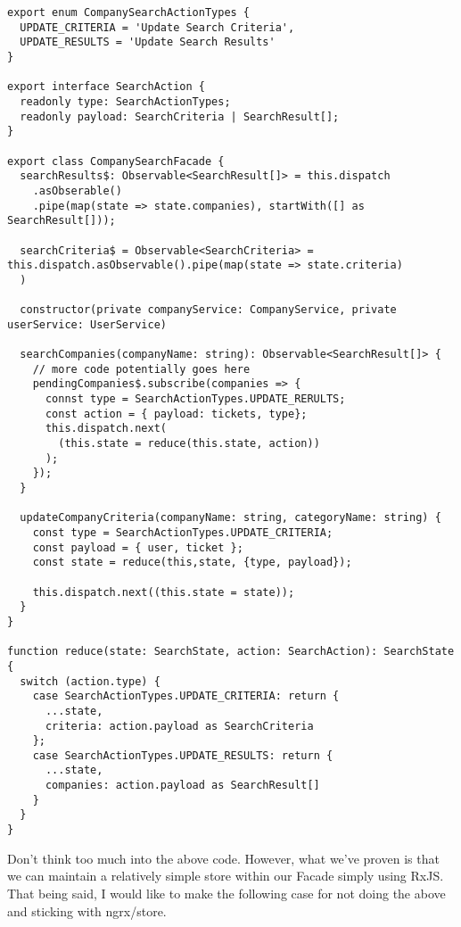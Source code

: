 \begin{lstlisting}[caption=company-search.facade.ts]
export enum CompanySearchActionTypes {
  UPDATE_CRITERIA = 'Update Search Criteria',
  UPDATE_RESULTS = 'Update Search Results'
}

export interface SearchAction {
  readonly type: SearchActionTypes;
  readonly payload: SearchCriteria | SearchResult[];
}

export class CompanySearchFacade {
  searchResults$: Observable<SearchResult[]> = this.dispatch
    .asObserable() 
    .pipe(map(state => state.companies), startWith([] as SearchResult[]));

  searchCriteria$ = Observable<SearchCriteria> = this.dispatch.asObservable().pipe(map(state => state.criteria)
  ) 

  constructor(private companyService: CompanyService, private userService: UserService)
    
  searchCompanies(companyName: string): Observable<SearchResult[]> {
    // more code potentially goes here
    pendingCompanies$.subscribe(companies => {
      connst type = SearchActionTypes.UPDATE_RERULTS;
      const action = { payload: tickets, type};
      this.dispatch.next(
        (this.state = reduce(this.state, action))
      );
    });
  }

  updateCompanyCriteria(companyName: string, categoryName: string) {
    const type = SearchActionTypes.UPDATE_CRITERIA;
    const payload = { user, ticket };
    const state = reduce(this,state, {type, payload});

    this.dispatch.next((this.state = state));
  }
}  

function reduce(state: SearchState, action: SearchAction): SearchState {
  switch (action.type) {
    case SearchActionTypes.UPDATE_CRITERIA: return {
      ...state,
      criteria: action.payload as SearchCriteria
    };
    case SearchActionTypes.UPDATE_RESULTS: return {
      ...state,
      companies: action.payload as SearchResult[]
    }
  }
}
\end{lstlisting} 

Don't think too much into the above code. However, what we've proven is that we can maintain a relatively simple store within our Facade simply using RxJS. That being said, I would like to make the following case for not doing the above and sticking with ngrx/store.

